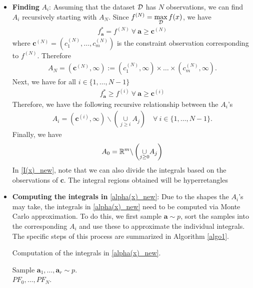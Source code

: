 \begin{itemize}
    \item \textbf{Finding} $A_i$: Assuming that the dataset $\mathcal{D}$ has $N$ observations, we can find $A_i$ recursively starting with $A_N$. Since $f^{(N)}=\max\limits_{\mathcal{D}} f(x)$, we have
    \begin{align}
        f^*_\textbf{a} = f^{(N)}\ \forall\ \textbf{a}\ge \textbf{c}^{(N)}
    \end{align}
    where $\textbf{c}^{(N)}=(c_1^{(N)},\ldots,c_m^{(N)})$ is the constraint observation corresponding to $f^{(N)}$. Therefore
    \begin{align}\label{A_N}
        A_N = (\textbf{c}^{(N)},\infty) := (c_1^{(N)},\infty)\times\ldots\times(c_m^{(N)},\infty).
    \end{align}
    Next, we have for all $i\in\{1,\ldots,N-1\}$
    \begin{align}
        f^*_\textbf{a} \ge f^{(i)}\ \forall\ \textbf{a}\ge \textbf{c}^{(i)}
    \end{align}
    Therefore, we have the following recursive relationship between the $A_i$'s
    \begin{align}\label{A_i}
        A_i = (\textbf{c}^{(i)},\infty)\backslash \left(\underset{j\ge i}{\cup}A_j\right)\quad \forall\ i\in\{1,\ldots,N-1\}.
    \end{align}
    Finally, we have
    \begin{align}\label{A_0}
        A_0 = \mathbb{R}^m \backslash \left(\underset{j\ge 0}{\cup}A_j\right)
    \end{align}
    In \eqref{I(x)_new}, note that we can also divide the integrals based on the observations of $\textbf{c}$. The integral regions obtained will be hyperretangles 
    \item \textbf{Computing the integrals in} \eqref{alpha(x)_new}: Due to the shapes the $A_i$'s may take, the integrals in \eqref{alpha(x)_new} need to be computed via Monte Carlo approximation. To do this, we first sample $\textbf{a}\sim p$, sort the samples into the corresponding $A_i$ and use these to approximate the individual integrals. The specific steps of this process are summarized in Algorithm \ref{algo1}.

    \begin{algorithm}[h]
    \caption{Computation of the integrals in \eqref{alpha(x)_new}.}
    \label{algo1}
    Sample $\textbf{a}_1,\ldots, \textbf{a}_r \sim p$.\\
    \Return $PF_0,\ldots,PF_N$.
    \end{algorithm}
\end{itemize}

